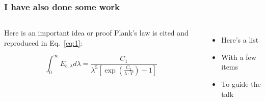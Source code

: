 \begin{frame}
    \frametitle{I have also done some work}

    \begin{columns}


            \begin{blocki}
                {Here is an important idea or proof}
                Plank's law is cited \citep{planck1914theory} and reproduced in Eq.~\ref{eq:1}:

                \begin{equation}
                    \int_0^\infty E_{b,\lambda} d\lambda = \frac{C_1}{\lambda^5 \left[ \exp\left( \frac{C_2}{\lambda \cdot T} \right) - 1 \right]}  
                    \label{eq:1}
                \end{equation}


            \end{blocki}


            \begin{itemize}
                \item Here's a list
                \item With a few items
                \item To guide the talk
            \end{itemize}


    \end{columns}

\end{frame}


